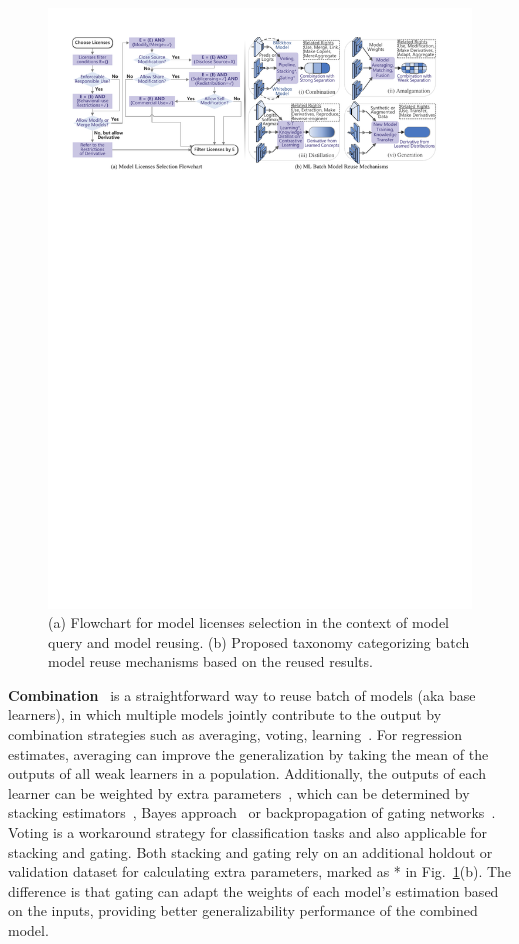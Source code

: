 \begin{figure}[t]
    \centering
    \includegraphics[width=\linewidth]{fig/flowchart.pdf}
    \caption{(a) Flowchart for model licenses selection in the context of model query and model reusing. (b) Proposed taxonomy categorizing batch model reuse mechanisms based on the reused results.}
    \Description{}
    \label{fig:flowchart}
\end{figure}

\textbf{Combination}~\cite{zhou2012ensemble} is a straightforward way to reuse batch of models (aka base learners), in which multiple models jointly contribute to the output by combination strategies such as averaging, voting, learning~\cite{jacobs1991adaptive, wolpert1992stacked}.
For regression estimates, averaging can improve the generalization by taking the mean of the outputs of all weak learners in a population. Additionally, the outputs of each learner can be weighted by extra parameters~\cite{perrone1995networks}, which can be determined by stacking estimators~\cite{wolpert1992stacked}, Bayes approach~\cite{clarke2003comparing} or backpropagation of gating networks~\cite{jacobs1991adaptive}. 
Voting is a workaround strategy for classification tasks and also applicable for stacking and gating.
Both stacking and gating rely on an additional holdout or validation dataset for calculating extra parameters, marked as * in Fig.~\ref{fig:flowchart}(b). 
The difference is that gating can adapt the weights of each model's estimation based on the inputs, providing better generalizability performance of the combined model.


